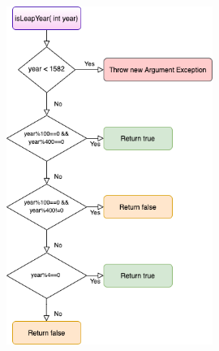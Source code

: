 \documentclass{article}
\begin{document}
\begin{figure}
\centering
\includegraphics[width=0.6\textwidth]{isleapyearFigure.png}
\end{figure}
\end{document}
